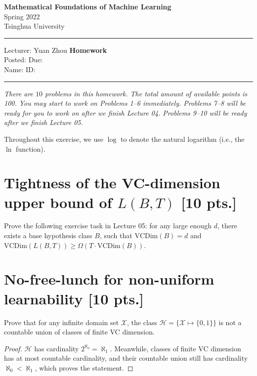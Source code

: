 \documentclass[12pt,letterpaper]{article}
\newcommand{\posted}{\text{Apr 2, 2022}}       			%
\newcommand{\due}{\text{Apr 18 23:59, 2022}} 			%
\newcommand{\hwno}{\text{3}} 		           			%
\newcommand{\name}{\text{}}  	          			%
\newcommand{\id}{\text{}}		       			%
\theoremstyle{definition}
\begin{document}
\vspace*{-4\baselineskip}
\thispagestyle{empty}


\begin{center}
{\bf\large Mathematical Foundations of Machine Learning}\\
{Spring 2022}\\
Tsinghua University
\end{center}
\rule{\textwidth}{2pt}
\noindent
Lecturer: Yuan Zhou   			 %
\hfill
\textbf{Homework \hwno}             			
\\
Posted: \posted
\hfill
Due: \due
\\
Name: \name             			
\hfill
ID: \id					
\hfill
\rule{\textwidth}{2pt}

\medskip
{ \it There are $10$ problems in this homework. The total amount of available points is 100. You may start to work on Problems 1--6 immediately. Problems 7--8 will be ready for you to work on after we finish Lecture 04. Problems 9--10 will be ready after we finish Lecture 05.

Throughout this exercise, we use $\log$ to denote the natural logarithm (i.e., the $\ln$ function).
}


\section{Tightness of the VC-dimension upper bound of $L(B, T)$ [10 pts.]}
\vspace{-2ex}


Prove the following exercise task in Lecture 05: for any large enough $d$, there exists a base hypothesis class $B$, such that $\mathrm{VCDim}(B)=d$ and $\mathrm{VCDim}(L(B, T)) \geq \Omega(T \cdot \mathrm{VCDim}(B))$.


\section{No-free-lunch for non-uniform learnability [10 pts.]} 
\vspace{-2ex}


Prove that for any infinite domain set $\mathcal{X}$, the class $\mathcal{H}=\{\mathcal{X} \mapsto\{0,1\}\}$ is not a countable union of classes of finite VC dimension.

\begin{proof}
  $\mathcal{H}$ has cardinality $2^{\aleph_0}=\aleph_{1}$. Meanwhile, classes of finite VC dimension has at most countable cardinality, and their countable union still has cardinality $\aleph_0< \aleph_1$, which proves the statement.
\end{proof}
\end{document}
